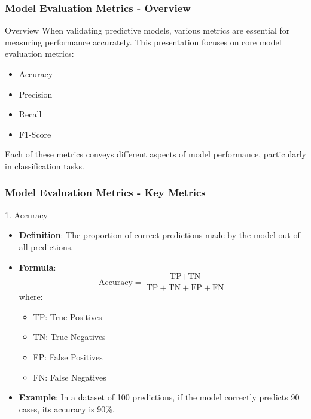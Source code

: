 \documentclass[aspectratio=169]{beamer}
\begin{document}
\begin{frame}[fragile]
    \frametitle{Model Evaluation Metrics - Overview}
    \begin{block}{Overview}
        When validating predictive models, various metrics are essential for measuring performance accurately. This presentation focuses on core model evaluation metrics:
        \begin{itemize}
            \item Accuracy
            \item Precision
            \item Recall
            \item F1-Score
        \end{itemize}
        Each of these metrics conveys different aspects of model performance, particularly in classification tasks.
    \end{block}
\end{frame}

\begin{frame}[fragile]
    \frametitle{Model Evaluation Metrics - Key Metrics}
    \begin{block}{1. Accuracy}
        \begin{itemize}
            \item \textbf{Definition}: The proportion of correct predictions made by the model out of all predictions.
            \item \textbf{Formula}:
            \begin{equation}
            \text{Accuracy} = \frac{\text{TP} + \text{TN}}{\text{TP} + \text{TN} + \text{FP} + \text{FN}}
            \end{equation}
            where:
            \begin{itemize}
                \item TP: True Positives
                \item TN: True Negatives
                \item FP: False Positives
                \item FN: False Negatives
            \end{itemize}
            \item \textbf{Example}: In a dataset of 100 predictions, if the model correctly predicts 90 cases, its accuracy is 90\%.
        \end{itemize}
    \end{block}
\end{frame}
\end{document}
